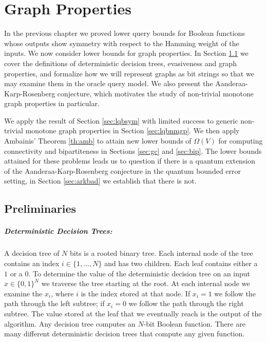 \newtheorem{conj}{Conjecture}[section]

\chapter{Graph Properties}
\label{ch:graph}

In the previous chapter we proved lower query bounds for Boolean
functions whose outputs show symmetry with respect to the Hamming
weight of the inputs.  We now consider lower bounds for graph
properties.  In Section \ref{sec:prelim} we cover the definitions of
deterministic decision trees, evasiveness and graph properties, and
formalize how we will represent graphs as bit strings so that we may
examine them in the oracle query model. We also present the
Aanderaa-Karp-Rosenberg conjecture, which motivates the study of
non-trivial monotone graph properties in particular.

We apply the result of Section \ref{sec:lqbsym} with limited success
to generic non-trivial monotone graph properties in Section
\ref{sec:lqbnmgp}.  We then apply Ambainis' Theorem \ref{th:amb} to 
attain new lower bounds of $\Omega(V)$ for computing connectivity and
bipartiteness in Sections \ref{sec:gc} and \ref{sec:bip}.  The lower
bounds attained for these problems leads us to question if there is a
quantum extension of the Aanderaa-Karp-Rosenberg conjecture in the
quantum bounded error setting, in Section \ref{sec:arkbad} we
establish that there is not.

\section{Preliminaries}
\label{sec:prelim}

\paragraph{Deterministic Decision Trees:}
\label{subs:ddt}

A decision tree of $N$ bits is a rooted binary tree.  Each internal
node of the tree contains an index $i \in \{1, \ldots, N\}$ and has
two children.  Each leaf contains either a $1$ or a $0$. To determine
the value of the deterministic decision tree on an input $x
\in \{0,1\}^{N}$ we traverse the tree starting at the root.  At each
internal node we examine the $x_{i}$, where $i$ is the index stored at
that node.  If $x_{i} = 1$ we follow the path through the left
subtree; if $x_{i} = 0$ we follow the path through the right subtree.
The value stored at the leaf that we eventually reach is the output of
the algorithm.  Any decision tree computes an $N$-bit Boolean
function.  There are many different deterministic decision trees that
compute any given function.

